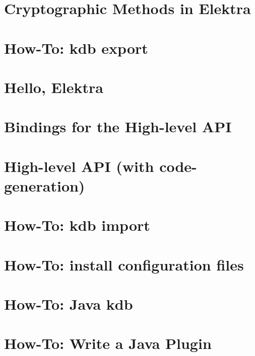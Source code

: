 \let\mypdfximage\pdfximage\def\pdfximage{\immediate\mypdfximage}\documentclass[twoside]{book}
\newcommand{\+}{\discretionary{\mbox{\scriptsize$\hookleftarrow$}}{}{}}
\begin{document}
\chapter{Cryptographic Methods in Elektra}
\label{doc_tutorials_crypto_md}

\chapter{How-\/\+To\+: kdb export}
\label{doc_tutorials_export_md}

\chapter{Hello, Elektra}
\label{doc_tutorials_hello-elektra_md}

\chapter{Bindings for the High-\/level A\+PI}
\label{doc_tutorials_highlevel-bindings_md}

\chapter{High-\/level A\+PI (with code-\/generation)}
\label{doc_tutorials_highlevel_md}

\chapter{How-\/\+To\+: kdb import}
\label{doc_tutorials_import_md}

\chapter{How-\/\+To\+: install configuration files}
\label{doc_tutorials_install-config-files_md}

\chapter{How-\/\+To\+: Java kdb}
\label{doc_tutorials_java-kdb_md}

\chapter{How-\/\+To\+: Write a Java Plugin}
\label{doc_tutorials_java-plugins_md}

\end{document}
